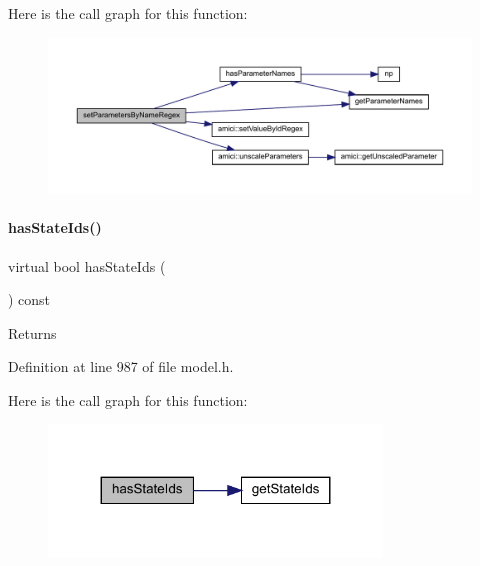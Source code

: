 Here is the call graph for this function\+:
\nopagebreak
\begin{figure}[H]
\begin{center}
\leavevmode
\includegraphics[width=350pt]{classamici_1_1_model_a1307ed45ccda80e84174d6b495c85d8d_cgraph}
\end{center}
\end{figure}
\mbox{\label{classamici_1_1_model_aa249cbfe9223101f4492ace0b14e4eab}} 
\paragraph{\texorpdfstring{has\+State\+Ids()}{hasStateIds()}}
{\footnotesize\ttfamily virtual bool has\+State\+Ids (\begin{DoxyParamCaption}{ }\end{DoxyParamCaption}) const\hspace{0.3cm}{\ttfamily [virtual]}}

\begin{DoxyReturn}{Returns}

\end{DoxyReturn}


Definition at line 987 of file model.\+h.

Here is the call graph for this function\+:
\nopagebreak
\begin{figure}[H]
\begin{center}
\leavevmode
\includegraphics[width=251pt]{classamici_1_1_model_aa249cbfe9223101f4492ace0b14e4eab_cgraph}
\end{center}
\end{figure}
\mbox{\label{classamici_1_1_model_a8a93b9fcddaaa762dacc654ffc379af1}} 
